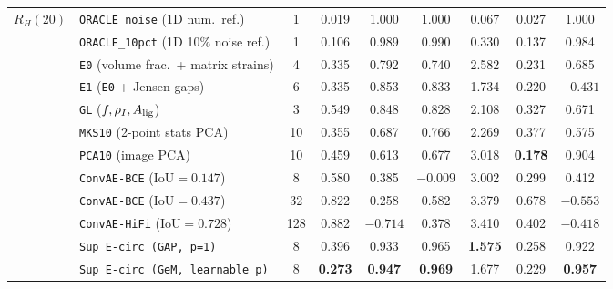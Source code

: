 \documentclass[preprint,11pt,a4paper]{elsarticle}
\begin{document}
\begin{table}[ht!]
\begin{tabular}{llccccccc}
\midrule
$R_H(20)$
 & \texttt{ORACLE\_noise} (1D num.\ ref.) & 1 & 0.019 & 1.000 & 1.000 & 0.067 & 0.027 & 1.000 \\
 & \texttt{ORACLE\_10pct} (1D 10\% noise ref.) & 1 & 0.106 & 0.989 & 0.990 & 0.330 & 0.137 & 0.984 \\
 & \texttt{E0} (volume frac.\ + matrix strains) & 4 & 0.335 & 0.792 & 0.740 & 2.582 & 0.231 & 0.685 \\
 & \texttt{E1} (\texttt{E0} + Jensen gaps) & 6 & 0.335 & 0.853 & 0.833 & 1.734 & 0.220 & $-0.431$ \\
 & \texttt{GL} ($f, \rho_I, A_{\rm lig}$) & 3 & 0.549 & 0.848 & 0.828 & 2.108 & 0.327 & 0.671 \\
 & \texttt{MKS10} (2-point stats PCA) & 10 & 0.355 & 0.687 & 0.766 & 2.269 & 0.377 & 0.575 \\
 & \texttt{PCA10} (image PCA) & 10 & 0.459 & 0.613 & 0.677 & 3.018 & \textbf{0.178} & 0.904 \\
 & \texttt{ConvAE-BCE} ($\text{IoU}=0.147$) & 8 & 0.580 & 0.385 & $-0.009$ & 3.002 & 0.299 & 0.412 \\
 & \texttt{ConvAE-BCE} ($\text{IoU}=0.437$) & 32 & 0.822 & 0.258 & 0.582 & 3.379 & 0.678 & $-0.553$ \\
 & \texttt{ConvAE-HiFi} ($\text{IoU}=0.728$) & 128 & 0.882 & $-0.714$ & 0.378 & 3.410 & 0.402 & $-0.418$ \\
 & \texttt{Sup E-circ (GAP, p=1)} & 8 & 0.396 & 0.933 & 0.965 & \textbf{1.575} & 0.258 & 0.922 \\
 & \texttt{Sup E-circ (GeM, learnable p)} & 8 & \textbf{0.273} & \textbf{0.947} & \textbf{0.969} & 1.677 & 0.229 & \textbf{0.957} \\
\bottomrule
\end{tabular}
\end{table}
\end{document}
